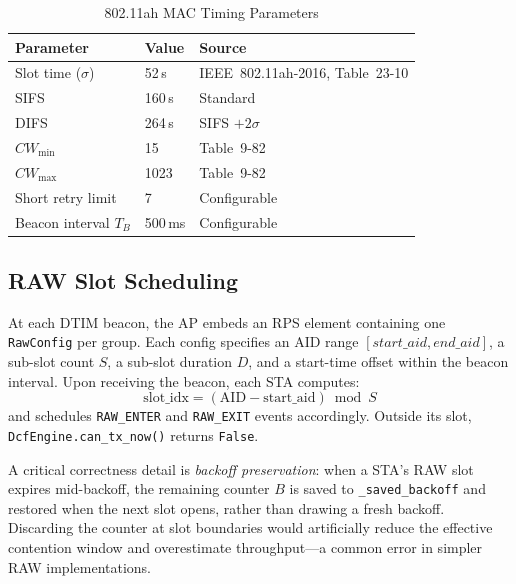 \documentclass[conference]{IEEEtran}
\begin{document}
\begin{table}[!t]
\renewcommand{\arraystretch}{1.15}
\caption{802.11ah MAC Timing Parameters}
\label{tab:timing}
\centering
\begin{tabular}{@{}lll@{}}
\toprule
\textbf{Parameter} & \textbf{Value} & \textbf{Source} \\
\midrule
Slot time ($\sigma$)   & 52\,\textmu{}s  & IEEE~802.11ah-2016, Table~23-10 \\
SIFS                   & 160\,\textmu{}s & Standard \\
DIFS                   & 264\,\textmu{}s & SIFS $+ 2\sigma$ \\
$CW_\mathrm{min}$      & 15              & Table~9-82 \\
$CW_\mathrm{max}$      & 1023            & Table~9-82 \\
Short retry limit      & 7               & Configurable \\
Beacon interval $T_B$  & 500\,ms         & Configurable \\
\bottomrule
\end{tabular}
\end{table}

\subsection{RAW Slot Scheduling}

At each DTIM beacon, the AP embeds an RPS element containing one
\texttt{RawConfig} per group.
Each config specifies an AID range $[\textit{start\_aid}, \textit{end\_aid}]$,
a sub-slot count $S$, a sub-slot duration $D$, and a start-time offset within
the beacon interval.
Upon receiving the beacon, each STA computes:
\begin{equation}
  \mathrm{slot\_idx} = (\mathrm{AID} - \mathrm{start\_aid}) \bmod S
\end{equation}
and schedules \texttt{RAW\_ENTER} and \texttt{RAW\_EXIT} events accordingly.
Outside its slot, \texttt{DcfEngine.can\_tx\_now()} returns \texttt{False}.

A critical correctness detail is \emph{backoff preservation}: when a STA's
RAW slot expires mid-backoff, the remaining counter $B$ is saved to
\texttt{\_saved\_backoff} and restored when the next slot opens, rather than
drawing a fresh backoff.
Discarding the counter at slot boundaries would artificially reduce the
effective contention window and overestimate throughput---a common error in
simpler RAW implementations.
\end{document}
